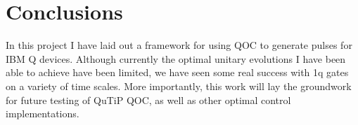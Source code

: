 \documentclass[12pt]{article}
\begin{document}
\section{Conclusions}\label{conclusions}

In this project I have laid out a framework for using QOC to generate pulses for
IBM Q devices. Although currently the optimal unitary evolutions I have been
able to achieve have been limited, we have seen some real success with 1q gates
on a variety of time scales. More importantly, this work will lay the groundwork
for future testing of QuTiP QOC, as well as other optimal control
implementations.



\end{document}
